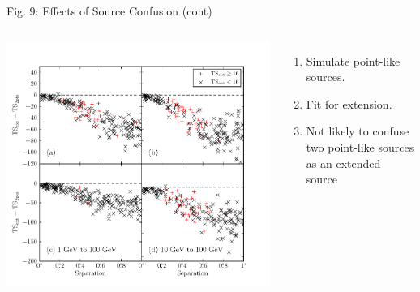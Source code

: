 \documentclass[12pt]{beamer}
\begin{document}
\begin{frame}{Fig. 9: Effects of Source Confusion (cont)}

  \begin{columns}

    \includegraphics[scale=0.45]{plots/confusion_2pts_plot_color.pdf}
    \begin{enumerate}
      \item Simulate point-like sources. 
      \item Fit for extension.
      \item Not likely to confuse two point-like sources
      as an extended source
    \end{enumerate}
  \end{columns}
\end{frame}
\end{document}
